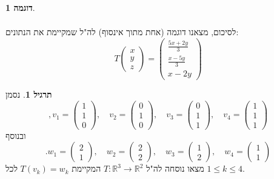 \documentclass[12pt]{report}
\theoremstyle{plain}
\theoremstyle{definition}
\newtheorem{example}{דוגמה}[chapter]
\newtheorem{exercise}{תרגיל}[chapter]
\newcommand{\R}{\mathbb{R}}
\newcommand{\0}{\mathbf{0}}
\begin{document}
\begin{example}
\begin{enumerate}[label=\alph*.]
$$\begin{aligned}
\end{aligned}
$$
לסיכום, מצאנו דוגמה (אחת מתוך אינסוף) לה"ל שמקיימת את הנתונים:
$$
T\begin{pmatrix}x\\y\\z\end{pmatrix}=\begin{pmatrix}\frac{5x+2y}{3}\\\frac{x-5y}{3}\\x-2y\end{pmatrix}
$$

\end{enumerate}
\end{example}

\begin{exercise}
נסמן
$$
,v_1=\begin{pmatrix}1\\1\\0\end{pmatrix},\quad v_2=\begin{pmatrix}0\\1\\0\end{pmatrix},\quad v_3=\begin{pmatrix}0\\1\\1\end{pmatrix},\quad v_4=\begin{pmatrix}1\\1\\1\end{pmatrix}
$$
ובנוסף
$$
.w_1=\begin{pmatrix}2\\1\end{pmatrix},\quad w_2=\begin{pmatrix}2\\2\end{pmatrix},\quad w_3=\begin{pmatrix}1\\2\end{pmatrix},\quad w_4=\begin{pmatrix}1\\1\end{pmatrix}
$$
מצאו נוסחה לה"ל 
$T:\R^3\to\R^2$
המקיימת
$T(v_k)=w_k$
לכל
$1\leq k\leq 4$.
\end{exercise}
\end{document}
